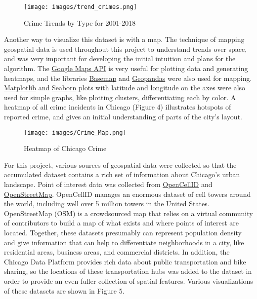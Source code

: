 \documentclass[times new roman,12pt]{article}
\begin{document}
\begin{figure}[H]
\centering
  \texttt{[image: images/trend\_crimes.png]}
  \caption{Crime Trends by Type for 2001-2018}
  \label{fig:crime_trends}
\end{figure}

Another way to visualize this dataset is with a map. The technique of mapping geospatial data is used throughout this project to understand trends over space, and was very important for developing the initial intuition and plans for the algorithm. The \href{https://developers.google.com/maps/documentation/}{Google Maps API} is very useful for plotting data and generating heatmaps, and the libraries \href{https://basemaptutorial.readthedocs.io/en/latest/}{Basemap} and \href{http://geopandas.org}{Geopandas} were also used for mapping. \href{https://matplotlib.org}{Matplotlib} and \href{https://seaborn.pydata.org}{Seaborn} plots with latitude and longitude on the axes were also used for simple graphs, like plotting clusters, differentiating each by color. A heatmap of all crime incidents in Chicago (Figure 4) illustrates hotspots of reported crime, and gives an initial understanding of parts of the city's layout.

\begin{figure}[H]
\centering
  \texttt{[image: images/Crime\_Map.png]}
  \caption{Heatmap of Chicago Crime}
  \label{fig:crime_map}
\end{figure}

For this project, various sources of geospatial data were collected so that the accumulated dataset contains a rich set of information about Chicago's urban landscape. Point of interest data was collected from \href{https://www.opencellid.org/#zoom=12&lat=41.8698&lon=-87.6727}{OpenCellID} and \href{https://www.openstreetmap.org/#map=12/41.8698/-87.6727&layers=C}{OpenStreetMap}. OpenCellID manages an enormous dataset of cell towers around the world, including well over 5 million towers in the United States. OpenStreetMap (OSM) is a crowdsourced map that relies on a virtual community of contributors to build a map of what exists and where points of interest are located. Together, these datasets presumably can represent population density and give information that can help to differentiate neighborhoods in a city, like residential areas, business areas, and commercial districts. In addition, the Chicago Data Platform provides rich data about public transportation and bike sharing, so the locations of these transportation hubs was added to the dataset in order to provide an even fuller collection of spatial features. Various visualizations of these datasets are shown in Figure 5.
\end{document}
